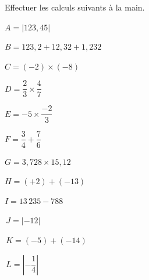 \begin{exercice} %
   Effectuer les calculs suivants à la main.
   \begin{multicols}{3}
      \begin{bigenumerate}
         \item $A =|123,45|$ \\
         \item $B =123,2+12,32+1,232$ \\
         \item $C =(-2)\times(-8)$ \\
         \item $D =\dfrac{2}{3}\times\dfrac{4}{7}$
         \item $E =-5\times\dfrac{-2}{3}$ \\
         \item $F=\dfrac{3}{4}+\dfrac{7}{6}$ \\
         \item $G =3,728\times15,12$ \\
         \item $H =(+2)+(-13)$
         \item $I =13\,235-788$ \\
         \item $\,J =|-12|$ \\
         \item $\,K =(-5)+(-14)$ \\
         \item $\,L =\left|-\dfrac14\right|$
      \end{bigenumerate}
   \end{multicols}
\end{exercice}
 
